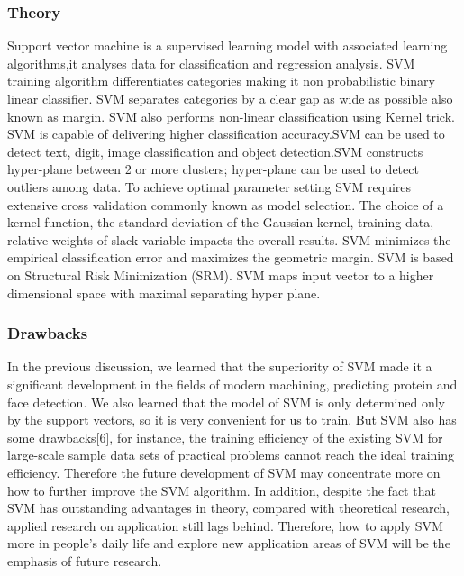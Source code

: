 \documentclass[14.49pt, a4paper, one side, margin = 2in]{article}
\begin{document}
\subsubsection{Theory}
Support vector machine is a supervised learning model with associated learning algorithms,it analyses data for classification and regression analysis. SVM training algorithm
differentiates categories making it non probabilistic binary linear classifier. SVM separates categories
by a clear gap as wide as possible also known as margin. SVM also performs non-linear classification
using Kernel trick. SVM is capable of delivering higher classification accuracy.SVM can be used to detect text, digit, image classification and object detection.SVM constructs hyper-plane between 2 or more clusters; hyper-plane can be used to detect outliers among data. To achieve optimal parameter setting SVM requires extensive cross validation commonly known as model selection. The choice of a kernel function, the standard deviation of the Gaussian kernel, training data, relative weights of slack variable impacts the overall results. SVM minimizes the empirical classification error and maximizes the geometric margin. SVM is based on Structural Risk Minimization (SRM). SVM maps input vector to a higher dimensional space with maximal separating hyper plane.\cite{paul2020comparative}
\subsubsection{Drawbacks}
In the previous discussion, we learned that the superiority of SVM made it a significant development in the fields of modern machining, predicting protein and face detection. We also learned that the model of SVM is only determined only by the support vectors, so it is very convenient for us to train. But SVM also has some drawbacks[6], for instance, the training efficiency of the existing SVM for large-scale sample data sets of practical problems cannot reach the ideal training efficiency. Therefore the future development of SVM may concentrate more on how to further improve the SVM algorithm. In addition, despite the fact that SVM has outstanding advantages in theory, compared with theoretical research, applied research on application still lags behind. Therefore, how to apply SVM more in people's daily life and explore new application areas of SVM will be the emphasis of future research.\cite{jun2021development}
\clearpage
\end{document}
